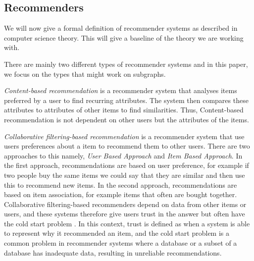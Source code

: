 \subsection{Recommenders}
\label{Subsec:recommenders}
We will now give a formal definition of recommender systems as described in computer science theory. This will give a baseline of the theory we are working with.

There are mainly two different  types of recommender systems and in this paper, we focus on the types that might work on subgraphs.

\textit{Content-based recommendation} is a recommender system that analyses items preferred by a user to find recurring attributes. The system then compares these attributes to attributes of other items to find similarities\cite{lu2015recommender}. Thus, Content-based recommendation is not dependent on other users but the attributes of the items.

\textit{Collaborative filtering-based recommendation} is a recommender system that use users preferences about a item to recommend them to other users. There are two approaches to this namely, \textit{User Based Approach} and \textit{Item Based Approach}. In the first approach, recommendations are based on user preference, for example if two people buy the same items we could say that they are similar and then use this to recommend new items. In the second approach, recommendations are based on item association, for example items that often are bought together.
Collaborative filtering-based recommenders depend on data from other items or users, and these systems therefore give users trust in the answer but often have the cold start problem \cite{lu2015recommender}. In this context, trust is defined as when a system is able to represent why it recommended an item, and the cold start problem is a common problem in recommender systems where a database or a subset of a database has inadequate data, resulting in unreliable recommendations\cite{Ricci2015}.
